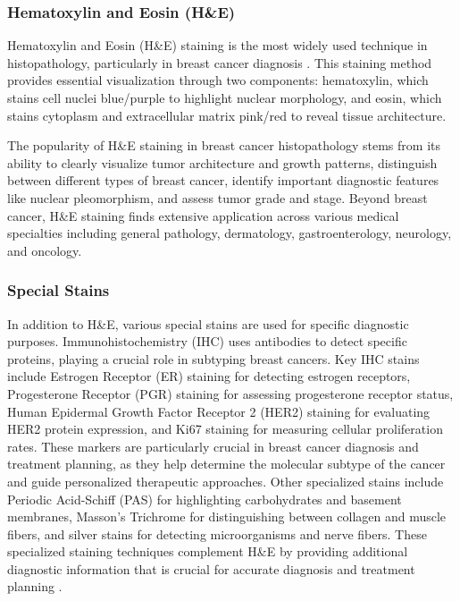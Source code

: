 \subsubsection{Hematoxylin and Eosin (H\&E)}

Hematoxylin and Eosin (H\&E) staining is the most widely used
technique in histopathology, particularly in breast cancer diagnosis
\cite{PanEtAl2021}. This staining method provides essential visualization
through two components: hematoxylin, which stains cell nuclei
blue/purple to highlight nuclear morphology, and eosin, which stains
cytoplasm and extracellular matrix pink/red to reveal tissue architecture.

The popularity of H\&E staining in breast cancer histopathology stems
from its ability to clearly visualize tumor architecture and growth
patterns, distinguish between different types of breast cancer,
identify important diagnostic features like nuclear pleomorphism, and
assess tumor grade and stage. Beyond breast cancer, H\&E staining
finds extensive application across various medical specialties
including general pathology, dermatology, gastroenterology,
neurology, and oncology.

\subsubsection{Special Stains}

In addition to H\&E, various special stains are used for specific
diagnostic purposes. Immunohistochemistry (IHC) uses antibodies to
detect specific proteins, playing a crucial role in subtyping breast
cancers. Key IHC stains include Estrogen Receptor (ER) staining for detecting
estrogen receptors, Progesterone Receptor (PGR) staining for assessing
progesterone receptor status, Human Epidermal Growth Factor Receptor 2
(HER2) staining for evaluating HER2 protein expression, and Ki67
staining for measuring cellular proliferation rates. These markers are
particularly crucial in breast cancer diagnosis and treatment planning,
as they help determine the molecular subtype of the cancer and guide
personalized therapeutic approaches. Other specialized stains include
Periodic Acid-Schiff (PAS) for highlighting carbohydrates and basement
membranes, Masson's Trichrome for distinguishing between collagen and
muscle fibers, and silver stains for detecting microorganisms and
nerve fibers. These specialized staining techniques complement H\&E
by providing additional diagnostic information that is crucial for
accurate diagnosis and treatment planning \cite{WeitzEtAl2023}.

